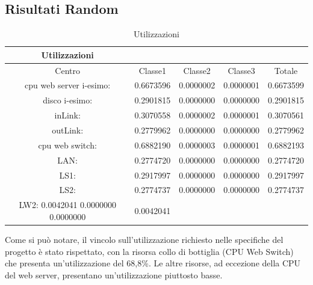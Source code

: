 \subsection{Risultati Random}
\begin{table}[H]
\begin{center}
\begin{tabular}{||c|c|c|c|c||}
\hline
Utilizzazioni\\
\hline
Centro &Classe1 &Classe2 &Classe3 &Totale\\
\hline
\hline
 cpu web server i-esimo: 	&0.6673596	&0.0000002	&0.0000001	&0.6673599\\
\hline
 disco i-esimo: 	&0.2901815	&0.0000000	&0.0000000	&0.2901815\\
\hline
 inLink: 	&0.3070558	&0.0000002	&0.0000001	&0.3070561\\
\hline
 outLink: 	&0.2779962	&0.0000000	&0.0000000	&0.2779962\\
\hline
 cpu web switch: 	&0.6882190	&0.0000003	&0.0000001	&0.6882193\\
\hline
 LAN: 	&0.2774720	&0.0000000	&0.0000000	&0.2774720\\
\hline
 LS1: 	&0.2917997	&0.0000000	&0.0000000	&0.2917997\\
\hline
 LS2:	&0.2774737	&0.0000000	&0.0000000	&0.2774737\\
\hline
 LW2: 	0.0042041	0.0000000	0.0000000	&0.0042041\\
\hline
\end{tabular}
\end{center}
\caption{Utilizzazioni}
\label{risrandom}
\end{table}
Come si può notare, il vincolo sull'utilizzazione richiesto nelle specifiche del progetto è stato rispettato, con la risorsa collo di bottiglia (CPU Web Switch) che presenta un'utilizzazione del 68,8\%. Le altre risorse, ad eccezione della CPU del web server, presentano un'utilizzazione piuttosto basse.

